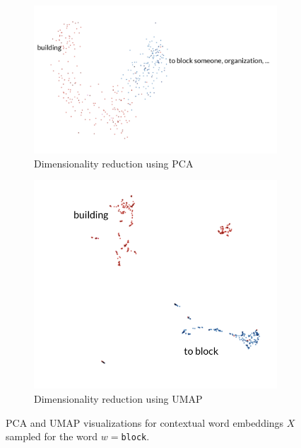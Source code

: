 \documentclass[a4paper,12pt,oneside,openright]{report}
\begin{document}
\begin{figure}[H]
\begin{subfigure}{.45\textwidth}
  \centering
  \includegraphics[width=\linewidth]{./assets/analysis/block_pca.png}
  \caption{Dimensionality reduction using PCA}
  \label{fig:sfig1}
\end{subfigure}%
\hfill
\begin{subfigure}{.45\textwidth}
  \centering
  \includegraphics[width=.7\linewidth]{./assets/analysis/block_umap.png}
  \caption{Dimensionality reduction using UMAP}
  \label{fig:sfig2}
\end{subfigure}
\caption{PCA and UMAP visualizations for contextual word embeddings $X$ sampled for the word $w=$\texttt{block}. }
\label{fig:was_tensorboard}
\end{figure}
\end{document}
